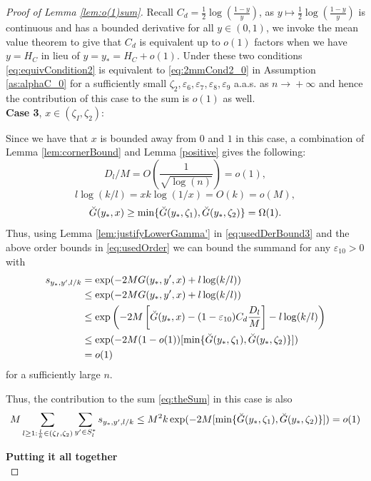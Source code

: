 \documentclass[12pt,reqno]{amsart}
\numberwithin{equation}{section}
\theoremstyle{definition}
\renewcommand{\epsilon}{\varepsilon}
\newcommand{\conv}[1]{\overset{#1}{\rightarrow}}
\renewcommand{\[}{\begin{equation}}
\renewcommand{\]}{\end{equation}}
\renewcommand{\|}{\bigg{|}}
\newcommand{\ngrow}{\ensuremath{n \conv{} +\infty} }
\begin{document}
\begin{proof}[Proof of Lemma \ref{lem:o(1)sum}]
    Recall $C_d = \frac{1}{2}\log\left( \frac{1-y}{y}\right)$, as $y\mapsto \frac{1}{2}\log\left( \frac{1-y}{y}\right)$ is continuous and has a bounded derivative for all $y \in (0,1)$, we invoke the mean value theorem to give that $C_d$ is equivalent up to $o(1)$ factors when we have $y = H_C$ in lieu of $y = y_* = H_C + o(1)$.  Under these two conditions \eqref{eq:equivCondition2} is equivalent to \eqref{eq:2mmCond2_0} in Assumption \ref{as:alphaC_0} for a sufficiently small $\zeta_2, \epsilon_6, \epsilon_7, \epsilon_8, \epsilon_9$ a.a.s. as \ngrow\! and hence the contribution of this case to the sum is $o(1)$ as well.\hfill\\
    
    \textbf{Case 3}, $x \in (\zeta_I, \zeta_2)$:
    
    Since we have that $x$ is bounded away from $0$ and $1$ in this case, a combination of Lemma \ref{lem:cornerBound} and Lemma \ref{positive} gives the following:
    \[D_l/M = O\left(\frac{1}{\sqrt{\log(n)}} \right) = o(1),\]
    \[l \log(k/l) = x k \log(1/x) = O(k) = o(M),\]
    \[\Breve{G}(y_*, x) \geq \min\{\Breve{G}(y_*, \zeta_1),\Breve{G}(y_*, \zeta_2)\} = \Omega(1).\]
    Thus, using Lemma \ref{lem:justifyLowerGamma'} in \eqref{eq:usedDerBound3} and the above order bounds in \eqref{eq:usedOrder} we can bound the summand for any $\epsilon_{10} > 0$ with
    \begin{align}
        s_{y_*, y', l/k} &= \exp(-2M G(y_*, y', x) + l \log(k/l))\\
        &\leq \exp(-2M G(y_*, y', x) + l \log(k/l))\\
        &\leq \exp\left(-2M \left[\Breve{G}(y_*, x) - (1 - \epsilon_{10})C_d\frac{D_l}{M}\right] - l \log(k/l) \right)\label{eq:usedDerBound3}\\
        &\leq \exp(-2M(1-o(1))[\min\{\Breve{G}(y_*, \zeta_1),\Breve{G}(y_*, \zeta_2)\}])\label{eq:usedOrder}\\
        & =o(1)
    \end{align}
    for a sufficiently large $n$.
    
    Thus, the contribution to the sum \eqref{eq:theSum} in this case is also
    \[M\sum_{l \geq 1: \frac{l}{k} \in (\zeta_I, \zeta_2)} \sum_{y ' \in S^*_l} s_{y_*, y', l/k}\leq M^2 k \exp(-2M[\min\{\Breve{G}(y_*, \zeta_1),\Breve{G}(y_*, \zeta_2)\}]) = o(1)\]
    
    \textbf{Putting it all together}\hfill\\
    

\end{proof}
\end{document}

